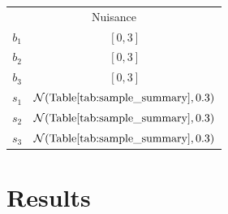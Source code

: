 \documentclass[twocolumn]{aastex631}
\begin{document}
{\begin{table}
\begin{tabular}{cc}
\\ \hline
\multicolumn{2}{c}{Nuisance}\\
$b_1$ & $[0,3]$\\
$b_2$ & $[0,3]$\\
$b_3$ & $[0,3]$\\
$s_1$ & $\mathcal{N}(\mathrm{Table} \ref{tab:sample_summary},0.3)$\\
$s_2$ & $\mathcal{N}(\mathrm{Table} \ref{tab:sample_summary},0.3)$ \\
$s_3$ & $\mathcal{N}(\mathrm{Table} \ref{tab:sample_summary},0.3)$ \\
\hline
\end{tabular}
\label{table:priors}
\end{table}

\section{Results}\label{sec.results}


}
\end{document}
